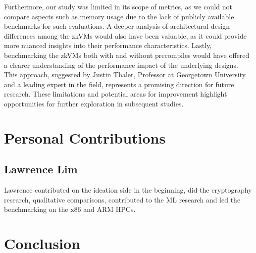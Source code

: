 \documentclass{scrartcl}
\begin{document}
Furthermore, our study was limited in its scope of metrics, as we could not compare aspects such as memory usage due to the lack of publicly available benchmarks for such evaluations. A deeper analysis of architectural design differences among the zkVMs would also have been valuable, as it could provide more nuanced insights into their performance characteristics. Lastly, benchmarking the zkVMs both with and without precompiles would have offered a clearer understanding of the performance impact of the underlying designs. This approach, suggested by Justin Thaler, Professor at Georgetown University and a leading expert in the field, represents a promising direction for future research. These limitations and potential areas for improvement highlight opportunities for further exploration in subsequent studies.

\section{Personal Contributions}
%
%
%
\subsection{Lawrence Lim}

Lawrence contributed on the ideation side in the beginning, did the cryptography research, qualitative comparisons, contributed to the ML research and led the benchmarking on the x86 and ARM HPCs.
%
%

\section{Conclusion}
\end{document}
